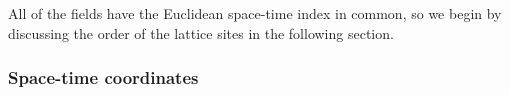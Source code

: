 All of the fields have the Euclidean space-time index in common, so we begin by discussing the order of the lattice sites in the following section.

\subsubsection{Space-time coordinates}




